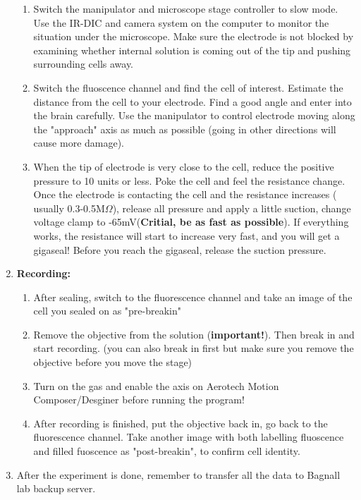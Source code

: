 \documentclass[11pt]{article}
\begin{document}
\begin{enumerate}[label=(\alph*)]
\begin{enumerate}[label=\arabic*.]
			\item Switch the manipulator and microscope stage controller to slow mode. Use the IR-DIC and camera system on the computer to monitor the situation under the microscope. Make sure the electrode is not blocked by examining whether internal solution is coming out of the tip and pushing surrounding cells away.
			\item Switch the fluoscence channel and find the cell of interest. Estimate the distance from the cell to your electrode. Find a good angle and enter into the brain carefully. Use the manipulator to control electrode moving along the "approach" axis as much as possible (going in other directions will cause more damage). 
			\item When the tip of electrode is very close to the cell, reduce the positive pressure to 10 units or less. Poke the cell and feel the resistance change. Once the electrode is contacting the cell and the resistance increases ( usually 0.3-0.5M$\Omega$), release all pressure and apply a little suction, change voltage clamp to -65mV(\textbf{Critial, be as fast as possible}). If everything works, the resistance will start to increase very fast, and you will get a gigaseal! Before you reach the gigaseal, release the suction pressure.
		\end{enumerate}
		\item \textbf{Recording:}
		\begin{enumerate}[label=\arabic*.]
			\item After sealing, switch to the fluorescence channel and take an image of the cell you sealed on as "pre-breakin"
			\item Remove the objective from the solution (\textbf{important!}). Then break in and start recording. (you can also break in first but make sure you remove the objective before you move the stage)
			\item Turn on the gas and enable the axis on Aerotech Motion Composer/Desginer before running the program!
			\item After recording is finished, put the objective back in, go back to the fluorescence channel. Take another image with both labelling fluoscence and filled fuoscence as "post-breakin", to confirm cell identity.
		\end{enumerate}
	\item After the experiment is done, remember to transfer all the data to Bagnall lab backup server.
	\end{enumerate}
\end{document}
